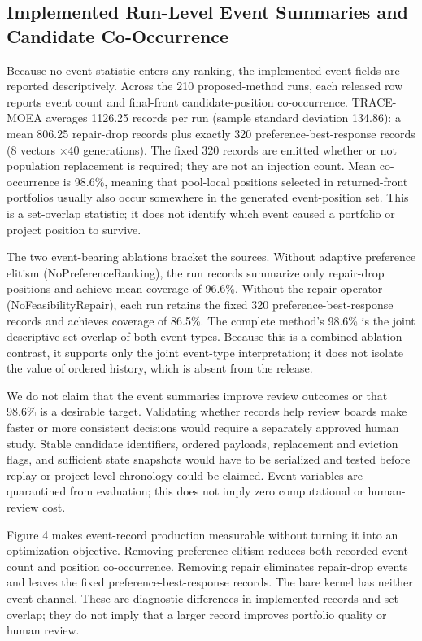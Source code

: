 \documentclass[energies,article,submit,moreauthors]{Definitions/mdpi}
\begin{document}
\subsection{Implemented Run-Level Event Summaries and Candidate Co-Occurrence}\label{implemented-run-level-event-records-and-candidate-co-occurrence}

Because no event statistic enters any ranking, the implemented event fields are reported descriptively. Across the 210 proposed-method runs, each released row reports event count and final-front candidate-position co-occurrence. TRACE-MOEA averages 1126.25 records per run (sample standard deviation 134.86): a mean 806.25 repair-drop records plus exactly 320 preference-best-response records (\(8\) vectors \(\times40\) generations). The fixed 320 records are emitted whether or not population replacement is required; they are not an injection count. Mean co-occurrence is 98.6\%, meaning that pool-local positions selected in returned-front portfolios usually also occur somewhere in the generated event-position set. This is a set-overlap statistic; it does not identify which event caused a portfolio or project position to survive.

The two event-bearing ablations bracket the sources. Without adaptive preference elitism (NoPreferenceRanking), the run records summarize only repair-drop positions and achieve mean coverage of 96.6\%. Without the repair operator (NoFeasibilityRepair), each run retains the fixed 320 preference-best-response records and achieves coverage of 86.5\%. The complete method's 98.6\% is the joint descriptive set overlap of both event types. Because this is a combined ablation contrast, it supports only the joint event-type interpretation; it does not isolate the value of ordered history, which is absent from the release.

We do not claim that the event summaries improve review outcomes or that 98.6\% is a desirable target. Validating whether records help review boards make faster or more consistent decisions would require a separately approved human study. Stable candidate identifiers, ordered payloads, replacement and eviction flags, and sufficient state snapshots would have to be serialized and tested before replay or project-level chronology could be claimed. Event variables are quarantined from evaluation; this does not imply zero computational or human-review cost.

Figure 4 makes event-record production measurable without turning it into an optimization objective. Removing preference elitism reduces both recorded event count and position co-occurrence. Removing repair eliminates repair-drop events and leaves the fixed preference-best-response records. The bare kernel has neither event channel. These are diagnostic differences in implemented records and set overlap; they do not imply that a larger record improves portfolio quality or human review.
\end{document}
